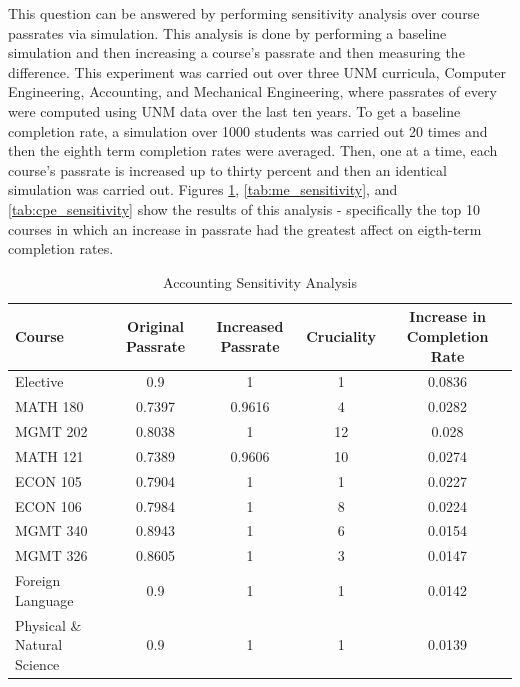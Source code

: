 \documentclass[botnum, fleqn]{unmeethesis}
\begin{document}
This question can be answered by performing sensitivity analysis over course passrates via simulation. This analysis is done by performing a baseline simulation and then increasing a course's passrate and then measuring the difference. This experiment was carried out over three UNM curricula, Computer Engineering, Accounting, and Mechanical Engineering, where passrates of every were computed using UNM data over the last ten years. To get a baseline completion rate, a simulation over 1000 students was carried out 20 times and then the eighth term completion rates were averaged. Then, one at a time, each course's passrate is increased up to thirty percent and then an identical simulation was carried out. Figures \ref{tab:accounting_sensitivity}, \ref{tab:me_sensitivity}, and \ref{tab:cpe_sensitivity} show the results of this analysis - specifically the top 10 courses in which an increase in passrate had the greatest affect on eigth-term completion rates.

\begin{table}[!h]
\tiny
\begin{tabular}{l*{4}{c}}
Course & Original Passrate & Increased Passrate & Cruciality & Increase in Completion Rate \\
\hline
Elective & 0.9 & 1 & 1 & 0.0836 \\
MATH 180 & 0.7397 & 0.9616 & 4 & 0.0282 \\
MGMT 202 & 0.8038 & 1 & 12 & 0.028 \\
MATH 121 & 0.7389 & 0.9606 & 10 & 0.0274 \\
ECON 105 & 0.7904 & 1 & 1 & 0.0227 \\
ECON 106 & 0.7984 & 1 & 8 & 0.0224 \\
MGMT 340 & 0.8943 & 1 & 6 & 0.0154 \\
MGMT 326 & 0.8605 & 1 & 3 & 0.0147 \\
Foreign Language & 0.9 & 1 & 1 & 0.0142 \\
Physical \& Natural Science & 0.9 & 1 & 1 & 0.0139 \\
\end{tabular}
\caption{Accounting Sensitivity Analysis} 
\label{tab:accounting_sensitivity}
\end{table}
\end{document}
